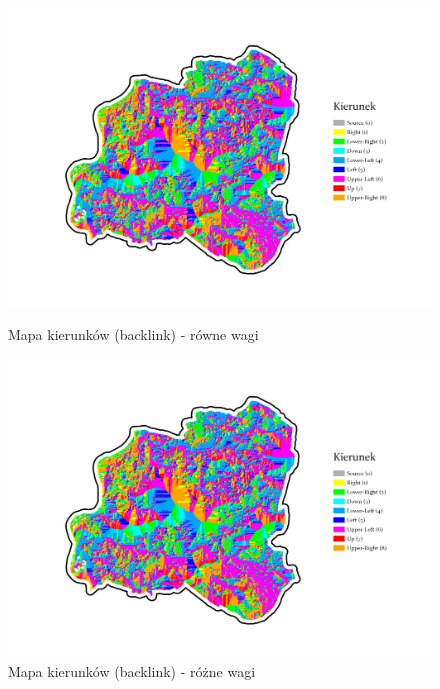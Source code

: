 \documentclass{article}
\begin{document}
\begin{figure}[H]
    \begin{minipage}[t]{0.48\textwidth}
        \centering
        \includegraphics[width=\linewidth]{img/plesna-cost-backlink.jpg}
        \caption{Mapa kierunków (backlink) - równe wagi}
        \label{fig:backlink-rowne}
    \end{minipage}
    \hfill
    \begin{minipage}[t]{0.48\textwidth}
        \centering
        \includegraphics[width=\linewidth]{img/plesna-cost-backlink.jpg}
        \caption{Mapa kierunków (backlink) - różne wagi}
        \label{fig:backlink-rozne}
    \end{minipage}
\end{figure}
\end{document}

